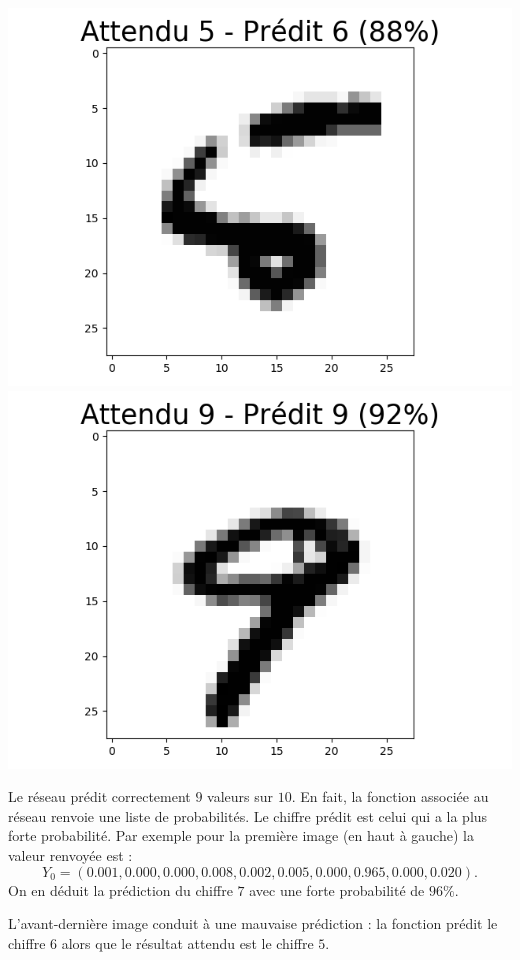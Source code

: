 \documentclass[11pt,class=report,crop=false]{standalone}
\begin{document}
\begin{center}
\includegraphics[scale=\myscale,scale=0.20]{figures/tf2-chiffre-test-result-8}
\includegraphics[scale=\myscale,scale=0.20]{figures/tf2-chiffre-test-result-9}
\end{center}

Le réseau prédit correctement $9$ valeurs sur $10$. 
En fait, la fonction associée au réseau renvoie une liste de probabilités. 
Le chiffre prédit est celui qui a la plus forte probabilité.
Par exemple pour la première image (en haut à gauche) la valeur renvoyée est :
$$Y_0 = (0.001, 0.000, 0.000, 0.008, 0.002, 0.005, 0.000, 0.965, 0.000, 0.020).$$
On en déduit la prédiction du chiffre $7$ avec une forte probabilité de $96\%$. 

L'avant-dernière image conduit à une mauvaise prédiction : la fonction prédit le chiffre $6$ alors que le résultat attendu est le chiffre $5$.
\end{document}
